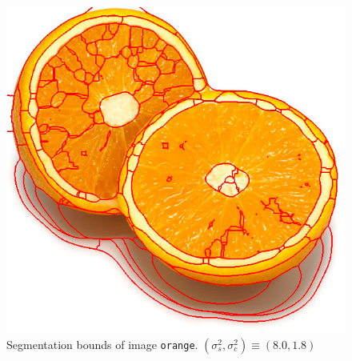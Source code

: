 {\begin{minipage}{\linewidth}
\begin{minipage}{0.45\linewidth}
\begin{figure}[H]
      \includegraphics[scale=0.4]{./images/02/orange/meanshift2_8_1.8.png}
      \caption{Segmentation bounds of image \texttt{orange}.
        $(\sigma_s^2, \sigma_c^2) \equiv (8.0, 1.8)$}
      \label{fig:02_orange2_8_1.8}
    \end{figure}
  \end{minipage}
\end{minipage}
}

